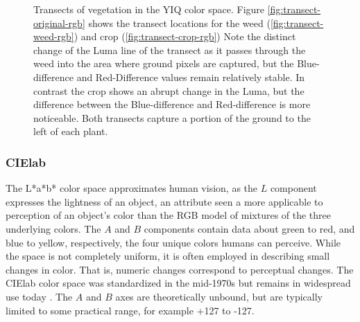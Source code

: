 \documentclass[letterpaper]{report}
\begin{document}
\begin{figure}[h]
	\centering
	\hfill
	\hfill
	\caption[YIQ Transects]{Transects of vegetation in the YIQ color space. Figure \ref{fig:transect-original-rgb} shows the transect locations for the weed (\ref{fig:transect-weed-rgb}) and crop (\ref{fig:transect-crop-rgb}) Note the distinct change of the Luma line of the transect as it passes through the weed into the area where ground pixels are captured, but the Blue-difference and Red-Difference values remain relatively stable.  In contrast the crop shows an abrupt change in the Luma, but the difference between the Blue-difference and Red-difference is more noticeable. Both transects capture a portion of the ground to the left of each plant.}
	\label{fig:transects-yiq}
\end{figure}


\subsubsection{CIElab}
The L*a*b* color space approximates human vision, as the $L$ component expresses  the lightness of an object, an attribute seen a more applicable to perception of an object's color than the RGB model of mixtures of the three underlying colors.  The $A$ and $B$ components contain data about green to red, and blue to yellow, respectively, the four unique colors humans can perceive. While the space is not completely uniform, it is often employed in describing small changes in color. That is, numeric changes correspond to perceptual changes. The CIElab color space was standardized in the mid-1970s but remains in widespread use today \cite{Leilich2023-lf}.  The $A$ and $B$ axes are theoretically unbound, but are typically limited to some practical range, for example +127 to -127. 
\end{document}
